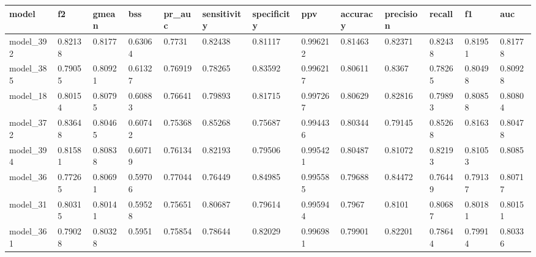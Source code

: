 \begin{tabular}{|l|l|l|l|l|l|l|l|l|l|l|l|l|}
\hline
\textbf{model} & \textbf{f2} & \textbf{gmean} & \textbf{bss} & \textbf{pr\_auc} & \textbf{sensitivity} & \textbf{specificity} & \textbf{ppv} & \textbf{accuracy} & \textbf{precision} & \textbf{recall} & \textbf{f1} & \textbf{auc} \\ \hline
model\_392     & 0.82138     & 0.8177         & 0.63064      & 0.7731           & 0.82438              & 0.81117              & 0.996212     & 0.81463           & 0.82371            & 0.82438         & 0.81951     & 0.81778      \\ \hline
model\_385     & 0.79055     & 0.80921        & 0.61327      & 0.76919          & 0.78265              & 0.83592              & 0.996217     & 0.80611           & 0.8367             & 0.78265         & 0.80498     & 0.80928      \\ \hline
model\_18      & 0.80154     & 0.80795        & 0.60883      & 0.76641          & 0.79893              & 0.81715              & 0.997267     & 0.80629           & 0.82816            & 0.79893         & 0.80858     & 0.80804      \\ \hline
model\_372     & 0.83648     & 0.80465        & 0.60742      & 0.75368          & 0.85268              & 0.75687              & 0.994436     & 0.80344           & 0.79145            & 0.85268         & 0.8163      & 0.80478      \\ \hline
model\_394     & 0.81581     & 0.80838        & 0.60719      & 0.76134          & 0.82193              & 0.79506              & 0.995421     & 0.80487           & 0.81072            & 0.82193         & 0.81053     & 0.8085       \\ \hline
model\_36      & 0.77265     & 0.80691        & 0.59706      & 0.77044          & 0.76449              & 0.84985              & 0.995585     & 0.79688           & 0.84472            & 0.76449         & 0.79137     & 0.80717      \\ \hline
model\_31      & 0.80315     & 0.80141        & 0.59528      & 0.75651          & 0.80687              & 0.79614              & 0.995944     & 0.7967            & 0.8101             & 0.80687         & 0.80181     & 0.80151      \\ \hline
model\_361     & 0.79028     & 0.80328        & 0.5951       & 0.75854          & 0.78644              & 0.82029              & 0.996981     & 0.79901           & 0.82201            & 0.78644         & 0.79914     & 0.80336      \\ \hline

\end{tabular}
